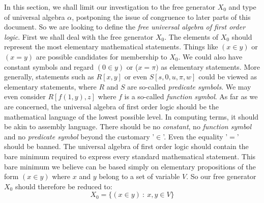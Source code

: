 In this section, we shall limit our investigation to the free
generator $X_{0}$ and type of universal algebra $\alpha$, postponing
the issue of congruence to later parts of this document. So we are
looking to define the {\em free universal algebra of first order
logic}. First we shall deal with the free generator $X_{0}$. The
elements of $X_{0}$ should represent the most elementary
mathematical statements. Things like $(x\in y)$ or $(x=y)$ are
possible candidates for membership to $X_{0}$. We could also have
constant symbols and regard $(0\in y)$ or ($x=\pi)$ as elementary
statements. More generally, statements such as $R[x,y]$ or even
$S[s,0,u,\pi,w]$ could be viewed as elementary statements, where $R$
and $S$ are so-called {\em predicate symbols}. We may even consider
$R[f(1,y),z]$ where $f$ is a so-called {\em function symbol}. As far
as we are concerned, the universal algebra of first order logic
should be the mathematical language of the lowest possible level. In
computing terms, it should be akin to assembly language. There
should be no {\em constant}, no {\em function symbol} and no {\em
predicate symbol} beyond the customary '$\in$'. Even the equality
'$=$' should be banned. The universal algebra of first order logic
should contain the bare minimum required to express every standard
mathematical statement. This bare minimum we believe can be based
simply on elementary propositions of the form $(x\in y)$ where $x$
and $y$ belong to a set of variable $V$. So our free generator
$X_{0}$ should therefore be reduced to:
    \[
    X_{0}=\{(x\in y)\ :\ x,y\in V\}
    \]

